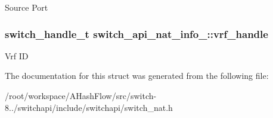 Source Port \hypertarget{structswitch__api__nat__info___a1149ec3ad18b9eaa5214fe334b7800e9}{
\subsubsection[{vrf\+\_\+handle}]{\setlength{\rightskip}{0pt plus 5cm}switch\+\_\+handle\+\_\+t switch\+\_\+api\+\_\+nat\+\_\+info\+\_\+\+::vrf\+\_\+handle}}\label{structswitch__api__nat__info___a1149ec3ad18b9eaa5214fe334b7800e9}
Vrf I\+D 

The documentation for this struct was generated from the following file\+:\begin{DoxyCompactItemize}
\item 
/root/workspace/\+A\+Hash\+Flow/src/switch-\/8../switchapi/include/switchapi/switch\+\_\+nat.\+h\end{DoxyCompactItemize}
